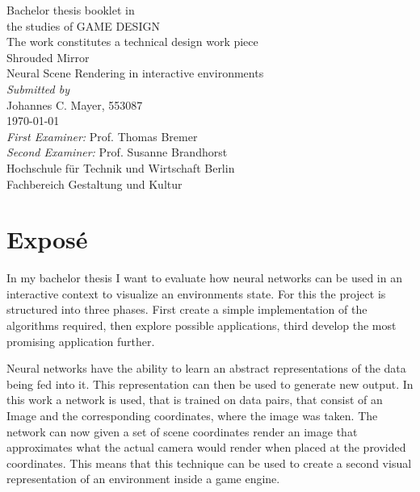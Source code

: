 \documentclass[a4paper, twoside, 10pt]{report}
\begin{document}
\begin{center}
\begin{spacing}{1.5}
{\Large
Bachelor thesis booklet in \\ the studies of GAME DESIGN \\
\vspace*{\fill}
The work constitutes a technical design work piece \\
\vspace*{\fill}
{\huge Shrouded Mirror} \\
Neural Scene Rendering in interactive environments \\
\vspace*{\fill}
\textit{Submitted by} \\
Johannes C. Mayer, 553087 \\
\today \\
\vspace*{\fill}
\textit{First Examiner:} Prof. Thomas Bremer \\
\textit{Second Examiner:} Prof. Susanne Brandhorst \\
\vspace*{\fill}
Hochschule f\"ur Technik und Wirtschaft Berlin \\
Fachbereich Gestaltung und Kultur \\
}
\end{spacing}
\end{center}

\chapter*{Expos\'e}
In my bachelor thesis I want to evaluate how neural networks can be used in an interactive context to visualize an environments state. For this the project is structured into three phases. First create a simple implementation of the algorithms required, then explore possible applications, third develop the most promising application further.

Neural networks have the ability to learn an abstract representations of the data being fed into it. This representation can then be used to generate new output. In this work a network is used, that is trained on data pairs, that consist of an Image and the corresponding coordinates, where the image was taken.  The network can now given a set of scene coordinates render an image that approximates what the actual camera would render when placed at the provided coordinates. This means that this technique can be used to create a second visual representation of an environment inside a game engine. 
\end{document}
